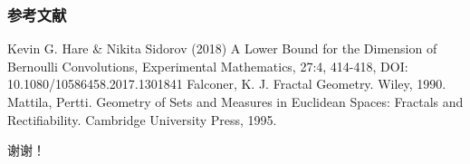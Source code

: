 \documentclass{beamer}
\numberwithin{equation}{section}
\theoremstyle{definition} \newtheorem{law}[thm]{Law}
\theoremstyle{plain} \newtheorem{jury}[thm]{Jury}
\theoremstyle{remark} \newtheorem*{marg}{Margaret}
\begin{document}
\begin{frame}
\frametitle{参考文献}\small
\footnotesize{
	\begin{thebibliography}{99} %
	
		  Kevin G. Hare \& Nikita Sidorov (2018) A Lower Bound for the Dimension of Bernoulli Convolutions, Experimental Mathematics, 27:4, 414-418, DOI: 10.1080/10586458.2017.1301841 
		 Falconer, K. J. Fractal Geometry. Wiley, 1990.
		 Mattila, Pertti. Geometry of Sets and Measures in Euclidean Spaces: Fractals and Rectifiability. Cambridge University Press, 1995.
		
	\end{thebibliography}
}
\end{frame}

\begin{frame}
\Huge{\centerline{谢谢！}}
\end{frame}

\end{document}
